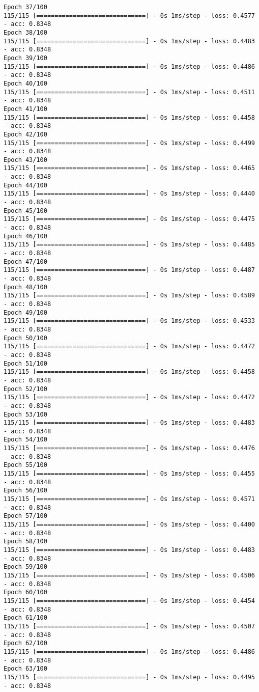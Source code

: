 \documentclass[11pt]{article}
\begin{document}
\begin{Verbatim}[commandchars=\\\{\}]
Epoch 37/100
115/115 [==============================] - 0s 1ms/step - loss: 0.4577 - acc: 0.8348
Epoch 38/100
115/115 [==============================] - 0s 1ms/step - loss: 0.4483 - acc: 0.8348
Epoch 39/100
115/115 [==============================] - 0s 1ms/step - loss: 0.4486 - acc: 0.8348
Epoch 40/100
115/115 [==============================] - 0s 1ms/step - loss: 0.4511 - acc: 0.8348
Epoch 41/100
115/115 [==============================] - 0s 1ms/step - loss: 0.4458 - acc: 0.8348
Epoch 42/100
115/115 [==============================] - 0s 1ms/step - loss: 0.4499 - acc: 0.8348
Epoch 43/100
115/115 [==============================] - 0s 1ms/step - loss: 0.4465 - acc: 0.8348
Epoch 44/100
115/115 [==============================] - 0s 1ms/step - loss: 0.4440 - acc: 0.8348
Epoch 45/100
115/115 [==============================] - 0s 1ms/step - loss: 0.4475 - acc: 0.8348
Epoch 46/100
115/115 [==============================] - 0s 1ms/step - loss: 0.4485 - acc: 0.8348
Epoch 47/100
115/115 [==============================] - 0s 1ms/step - loss: 0.4487 - acc: 0.8348
Epoch 48/100
115/115 [==============================] - 0s 1ms/step - loss: 0.4589 - acc: 0.8348
Epoch 49/100
115/115 [==============================] - 0s 1ms/step - loss: 0.4533 - acc: 0.8348
Epoch 50/100
115/115 [==============================] - 0s 1ms/step - loss: 0.4472 - acc: 0.8348
Epoch 51/100
115/115 [==============================] - 0s 1ms/step - loss: 0.4458 - acc: 0.8348
Epoch 52/100
115/115 [==============================] - 0s 1ms/step - loss: 0.4472 - acc: 0.8348
Epoch 53/100
115/115 [==============================] - 0s 1ms/step - loss: 0.4483 - acc: 0.8348
Epoch 54/100
115/115 [==============================] - 0s 1ms/step - loss: 0.4476 - acc: 0.8348
Epoch 55/100
115/115 [==============================] - 0s 1ms/step - loss: 0.4455 - acc: 0.8348
Epoch 56/100
115/115 [==============================] - 0s 1ms/step - loss: 0.4571 - acc: 0.8348
Epoch 57/100
115/115 [==============================] - 0s 1ms/step - loss: 0.4400 - acc: 0.8348
Epoch 58/100
115/115 [==============================] - 0s 1ms/step - loss: 0.4483 - acc: 0.8348
Epoch 59/100
115/115 [==============================] - 0s 1ms/step - loss: 0.4506 - acc: 0.8348
Epoch 60/100
115/115 [==============================] - 0s 1ms/step - loss: 0.4454 - acc: 0.8348
Epoch 61/100
115/115 [==============================] - 0s 1ms/step - loss: 0.4507 - acc: 0.8348
Epoch 62/100
115/115 [==============================] - 0s 1ms/step - loss: 0.4486 - acc: 0.8348
Epoch 63/100
115/115 [==============================] - 0s 1ms/step - loss: 0.4495 - acc: 0.8348

\end{Verbatim}
\end{document}
